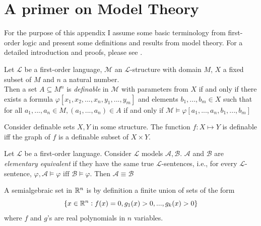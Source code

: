 \chapter{A primer on Model Theory}
\label{chap:model-theory}
For the purpose of this appendix I assume some basic terminology from first-order logic and present some definitions and results from model theory. For a detailed introduction and proofs, please see \cite{changModelTheory1990,Dries_1998}.

\begin{definition}
    \label{def:definable-set}
    Let $\mathcal{L}$ be a first-order language, $\mathcal{M}$ an $\mathcal{L}$-structure with domain $M$, $X$ a fixed subset of $M$ and $n$ a natural number. \\
    Then a set $A\subseteq M^n$ is \textit{definable} in $\mathcal{M}$ with parameters from $X$ if and only if there exists a formula $\varphi[x_1,x_2,...,x_n,y_1,...,y_m]$ and elements $b_1,...,b_m\in X$ such that for all $a_1,...,a_n\in M, (a_1,...,a_n)\in A$ if and only if $\mathcal{M}\models\varphi[a_1,...,a_n,b_1,...,b_m]$
\end{definition}

\begin{definition}
    \label{def:definable-function}
    Consider definable sets $X, Y$ in some structure. The function $f:X\mapsto Y$ is definable iff the graph of $f$ is a definable subset of $X\times Y$.
\end{definition}

\begin{definition}
    \label{def:elementary-equivalence}
    Let $\mathcal{L}$ be a first-order language. Consider $\mathcal{L}$ models $\mathcal{A}, \mathcal{B}$. $\mathcal{A}$ and $\mathcal{B}$ are \textit{elementary equivalent} if they have the same true $\mathcal{L}$-sentences, i.e., for every $\mathcal{L}$-sentence, $\varphi, \mathcal{A}\models\varphi \text{ iff }\mathcal{B}\models\varphi$. Then $\mathcal{A}\equiv\mathcal{B}$ 
\end{definition}

\begin{definition}
    \label{def:semialgebraic-set}
    A semialgebraic set in $\mathbb{R}^n$ is by definition a finite union of sets of the form
    \begin{equation*}
        \{x\in\mathbb{R}^n : f(x) = 0, g_1(x)>0,...,g_k(x)>0\}
    \end{equation*}
    where $f$ and $g$'s are real polynomials in $n$ variables.
\end{definition}

